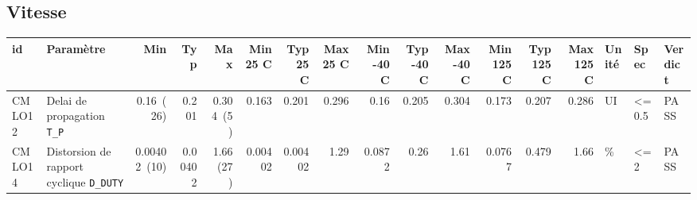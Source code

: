\documentclass[a4paper,10pt,landscape]{article}
\begin{document}
\subsection*{Vitesse}
{\footnotesize\setlength{\tabcolsep}{3pt}\begin{longtable}{lp{46mm}rrrrrrrrrrrrlp{24mm}p{19mm}}\toprule
id & Param\`etre & Min & Typ & Max & {\tiny Min 25 C} & {\tiny Typ 25 C} & {\tiny Max 25 C} & {\tiny Min -40 C} & {\tiny Typ -40 C} & {\tiny Max -40 C} & {\tiny Min 125 C} & {\tiny Typ 125 C} & {\tiny Max 125 C} & Unit\'e & Spec & Verdict \\ \midrule\endhead
CMLO12 & Delai de propagation {\tiny\texttt{T\_P}} & 0.16~(26) & 0.201 & 0.304~(5) & 0.163 & 0.201 & 0.296 & 0.16 & 0.205 & 0.304 & 0.173 & 0.207 & 0.286 & UI & \textless{}= 0.5 & PASS \\
CMLO14 & Distorsion de rapport cyclique {\tiny\texttt{D\_DUTY}} & 0.00402~(10) & 0.00402 & 1.66~(27) & 0.00402 & 0.00402 & 1.29 & 0.0872 & 0.26 & 1.61 & 0.0767 & 0.479 & 1.66 & \% & \textless{}= 2 & PASS \\
\bottomrule\end{longtable}}
\end{document}
